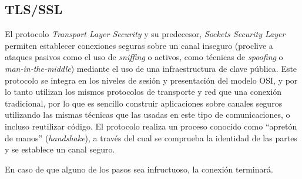 \subsection{TLS/SSL}
El protocolo \textit{Transport Layer Security}\cite{rfc5246} y su predecesor, \textit{Sockets Security Layer} permiten establecer conexiones seguras sobre un canal inseguro (proclive a ataques pasivos como el uso de \textit{sniffing} o activos, como técnicas de \textit{spoofing} o \textit{man-in-the-middle}) mediante el uso de una infraestructura de clave pública. Este protocolo se integra en los niveles de sesión y presentación del modelo OSI, y por lo tanto utilizan los mismos protocolos de transporte y red que una conexión tradicional, por lo que es sencillo construir aplicaciones sobre canales seguros utilizando las mismas técnicas que las usadas en este tipo de comunicaciones, o incluso reutilizar código. El protocolo realiza un proceso conocido como ``apretón de manos'' (\textit{handshake}), a través del cual se comprueba la identidad de las partes y se establece un canal seguro.

En caso de que alguno de los pasos sea infructuoso, la conexión terminará. 

